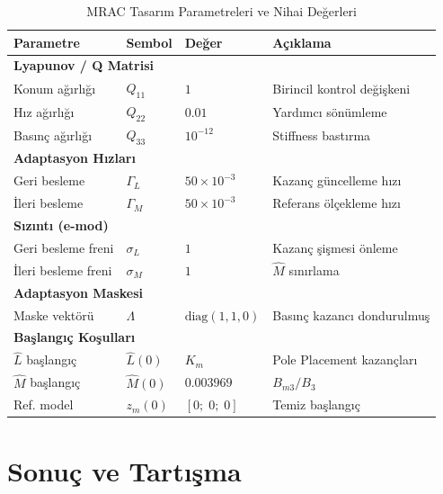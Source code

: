 \documentclass[12pt,a4paper]{article}
\begin{document}
\begin{table}[H]
\centering
\caption{MRAC Tasarım Parametreleri ve Nihai Değerleri}
\label{tab:params}
\begin{tabular}{llll}
\toprule
\textbf{Parametre} & \textbf{Sembol} & \textbf{Değer} & \textbf{Açıklama} \\
\midrule
\multicolumn{4}{l}{\textbf{Lyapunov / Q Matrisi}} \\
\midrule
Konum ağırlığı & $Q_{11}$ & $1$ & Birincil kontrol değişkeni \\
Hız ağırlığı & $Q_{22}$ & $0.01$ & Yardımcı sönümleme \\
Basınç ağırlığı & $Q_{33}$ & $10^{-12}$ & Stiffness bastırma \\
\midrule
\multicolumn{4}{l}{\textbf{Adaptasyon Hızları}} \\
\midrule
Geri besleme & $\Gamma_L$ & $50 \times 10^{-3}$ & Kazanç güncelleme hızı \\
İleri besleme & $\Gamma_M$ & $50 \times 10^{-3}$ & Referans ölçekleme hızı \\
\midrule
\multicolumn{4}{l}{\textbf{Sızıntı (e-mod)}} \\
\midrule
Geri besleme freni & $\sigma_L$ & $1$ & Kazanç şişmesi önleme \\
İleri besleme freni & $\sigma_M$ & $1$ & $\hat{M}$ sınırlama \\
\midrule
\multicolumn{4}{l}{\textbf{Adaptasyon Maskesi}} \\
\midrule
Maske vektörü & $\Lambda$ & $\text{diag}(1,1,0)$ & Basınç kazancı dondurulmuş \\
\midrule
\multicolumn{4}{l}{\textbf{Başlangıç Koşulları}} \\
\midrule
$\hat{L}$ başlangıç & $\hat{L}(0)$ & $K_m$ & Pole Placement kazançları \\
$\hat{M}$ başlangıç & $\hat{M}(0)$ & $0.003969$ & $B_{m3}/B_3$ \\
Ref. model & $z_m(0)$ & $[0;\;0;\;0]$ & Temiz başlangıç \\
\bottomrule
\end{tabular}
\end{table}

\section{Sonuç ve Tartışma}
\label{sec:conclusion}
\end{document}

